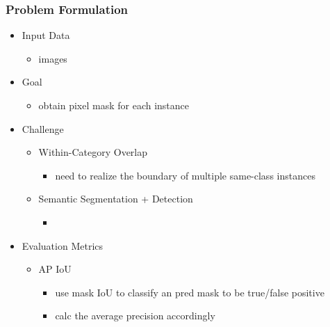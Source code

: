 \subsubsection{Problem Formulation}
\begin{itemize}
\item Input Data
	\begin{itemize}
	\item images
	\end{itemize}
\item Goal
	\begin{itemize}
	\item obtain pixel mask for each instance
	\end{itemize}
\item Challenge
	\begin{itemize}
	\item Within-Category Overlap
		\begin{itemize}
		\item need to realize the boundary of multiple same-class instances
		\end{itemize}
	\item Semantic Segmentation + Detection
		\begin{itemize}
		\item 
		\end{itemize}
	\end{itemize}
\item Evaluation Metrics
	\begin{itemize}
	\item AP \@ IoU
		\begin{itemize}
		\item use mask IoU to classify an pred mask to be true/false positive
		\item calc the average precision accordingly
		\end{itemize}
	\end{itemize}
\end{itemize}

